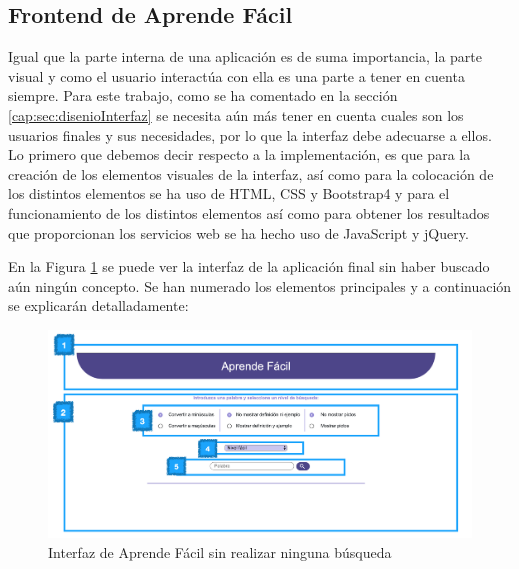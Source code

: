 \subsection{Frontend de Aprende Fácil}
\label{cap:subsec:frontendapp}
Igual que la parte interna de una aplicación es de suma importancia, la parte visual y como el usuario interactúa con ella es una parte a tener en cuenta siempre. Para este trabajo, como se ha comentado en la sección \ref{cap:sec:disenioInterfaz}  se necesita aún más tener en cuenta cuales son los usuarios finales y sus necesidades, por lo que la interfaz debe adecuarse a ellos.
Lo primero que debemos decir respecto a la implementación, es que para la creación de los elementos visuales de la interfaz, así como para la colocación de los distintos elementos se ha uso de HTML, CSS y Bootstrap4 y para el funcionamiento de los distintos elementos así como para obtener los resultados que proporcionan los servicios web se ha hecho uso de JavaScript y jQuery.

En la Figura \ref{fig:paginaInicial} se puede ver la interfaz de la aplicación final sin haber buscado aún ningún concepto. Se han numerado los elementos principales y a continuación se explicarán detalladamente:

\begin{figure}[!h]
	\includegraphics[width=1.1\textwidth]{Imagenes/Bitmap/Capitulo4/Frontend/paginaInicial.png}
	\centering
	\caption{Interfaz de Aprende Fácil  sin realizar ninguna búsqueda}
	\label{fig:paginaInicial}
\end{figure}


